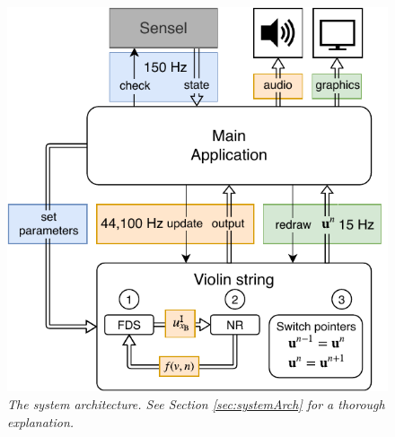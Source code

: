 \documentclass[twoside,a4paper,dvipsnames]{article}
\begin{document}
\begin{figure}[ht]
\centerline{\includegraphics[width=1.0\columnwidth]{systemArchitecture.pdf}}
\caption{\label{fig:systemArch}{\it The system architecture. See Section \ref{sec:systemArch} for a thorough explanation.}}
\end{figure}
\end{document}
